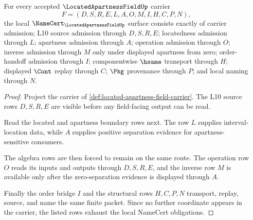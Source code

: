 \begin{theorem}
\label{thm:located-apartness-field-namecert-obligations}
For every accepted $\LocatedApartnessFieldUp$ carrier
$$
F=(D,S,R,E,L,A,O,M,I,H,C,P,N),
$$
the local $\NameCert_{\LocatedApartnessFieldUp}$ surface consists exactly of carrier admission; L10 source admission through $D,S,R,E$; locatedness admission through $L$; apartness admission through $A$; operation admission through $O$; inverse admission through $M$ only under displayed apartness from zero; order-handoff admission through $I$; componentwise $\hsame$ transport through $H$; displayed $\Cont$ replay through $C$; $\Pkg$ provenance through $P$; and local naming through $N$.
\end{theorem}
\begin{proof}
Project the carrier of \autoref{def:located-apartness-field-carrier}. The L10 source rows $D,S,R,E$ are visible before any field-facing output can be read.

Read the located and apartness boundary rows next. The row $L$ supplies interval-location data, while $A$ supplies positive separation evidence for apartness-sensitive consumers.

The algebra rows are then forced to remain on the same route. The operation row $O$ reads its inputs and outputs through $D,S,R,E$, and the inverse row $M$ is available only after the zero-separation evidence is displayed through $A$.

Finally the order bridge $I$ and the structural rows $H,C,P,N$ transport, replay, source, and name the same finite packet. Since no further coordinate appears in the carrier, the listed rows exhaust the local NameCert obligations.
\end{proof}

